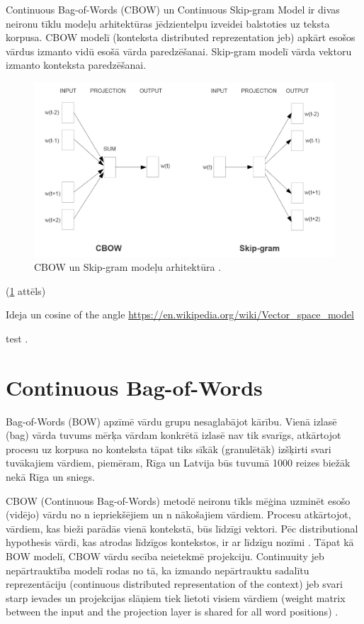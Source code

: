 Continuous Bag-of-Words (CBOW) un Continuous Skip-gram Model ir divas neironu tīklu modeļu arhitektūras jēdzientelpu izveidei balstoties uz teksta korpusa. CBOW modelī (konteksta distributed reprezentation jeb) apkārt esošos vārdus izmanto vidū esošā vārda paredzēšanai. Skip-gram modelī vārda vektoru izmanto konteksta paredzēšanai.

\begin{figure}[h]
	\centering
	\includegraphics[width=\textwidth]{figures/word2vec-models.png}
	\caption{CBOW un Skip-gram modeļu arhitektūra \cite{word2vec2013}.}
	\label{fig:cbow-skipgram}
\end{figure}


(\ref{fig:cbow-skipgram} attēls)



Ideja un cosine of the angle
\url{https://en.wikipedia.org/wiki/Vector_space_model}

test \cite{mikolov2013exploiting}.


\section{Continuous Bag-of-Words}

Bag-of-Words (BOW) apzīmē vārdu grupu nesaglabājot kārību. Vienā izlasē (bag) vārda tuvums mērķa vārdam konkrētā izlasē nav tik svarīgs, atkārtojot procesu uz korpusa no konteksta tāpat tiks sīkāk (granulētāk) izšķirti svari tuvākajiem vārdiem, piemēram, Rīga un Latvija būs tuvumā 1000 reizes biežāk nekā Rīga un sniegs.

CBOW (Continuous Bag-of-Words) metodē neironu tīkls mēģina uzminēt esošo (vidējo) vārdu no n iepriekšējiem un n nākošajiem vārdiem. Procesu atkārtojot, vārdiem, kas bieži parādās vienā kontekstā, būs līdzīgi vektori. Pēc distributional hypothesis vārdi, kas atrodas līdzīgos kontekstos, ir ar līdzīgu nozīmi \cite{word2vec2013}. Tāpat kā BOW modelī, CBOW vārdu secība neietekmē projekciju. Continuuity jeb nepārtrauktība modelī rodas no tā, ka izmando nepārtrauktu sadalītu reprezentāciju (continuous distributed representation of the context) jeb svari starp ievades un projekcijas slāņiem tiek lietoti visiem vārdiem (weight matrix between the input and the projection layer is shared for all word positions) \cite{word2vec2013}.


